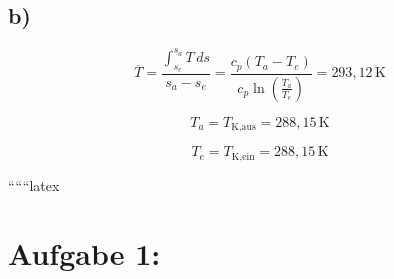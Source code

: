 

\subsection*{b)}

\[
\overline{T} = \frac{\int_{s_e}^{s_a} T \, ds}{s_a - s_e} = \frac{c_p \left( T_a - T_e \right)}{c_p \ln \left( \frac{T_a}{T_e} \right)} = 293{,}12 \, \text{K}
\]

\[
T_a = T_{\text{K,aus}} = 288{,}15 \, \text{K}
\]

\[
T_e = T_{\text{K,ein}} = 288{,}15 \, \text{K}
\]

``````latex


\section*{Aufgabe 1:}